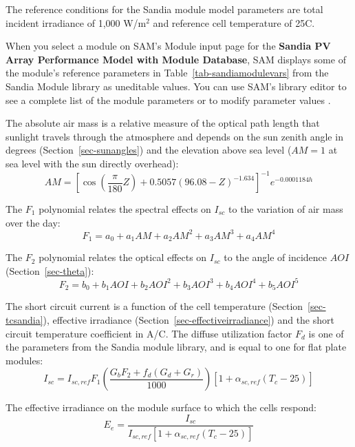 \documentclass[12pt,letterpaper]{article}
\newcommand\AOI{\ensuremath{\mathit{AOI}}}
\begin{document}
The reference conditions for the Sandia module model parameters are total incident irradiance of 1,000 W/m$^2$ and reference cell temperature of 25\degree C. 

When you select a module on SAM's Module input page for the \textbf{Sandia PV Array Performance Model with Module Database}, SAM displays some of the module's reference parameters in Table~\ref{tab-sandiamodulevars} from the Sandia Module library as uneditable values. You can use SAM's library editor to see a complete list of the module parameters or to modify parameter values \citep{help-libraries}.

The absolute air mass is a relative measure of the optical path length that sunlight travels through the atmosphere and depends on the sun zenith angle in degrees (Section~\ref{sec-sunangles}) and the elevation above sea level ($AM=1$ at sea level with the sun directly overhead):
\begin{equation}\label{eqn-sandiaam}
AM = \left[ \cos(\frac{\pi}{180} Z ) + 0.5057 (96.08 - Z)^{-1.634} \right]^{-1} e^{-0.0001184 h}
\end{equation}

The $F_1$ polynomial relates the spectral effects on $I_{sc}$ to the variation of air mass over the day:
\begin{equation}
F_1 = a_0 + a_1 AM + a_2 AM^2 + a_3 AM^3 + a_4 AM^4
\end{equation}

The $F_2$ polynomial relates the optical effects on $I_{sc}$ to the angle of incidence $\AOI$ (Section~\ref{sec-theta}):
\begin{equation}
F_2 = b_0 + b_1\AOI
		+ b_2\AOI^2
		+ b_3\AOI^3
		+ b_4\AOI^4
		+ b_5\AOI^5
\end{equation}

The short circuit current is a function of the cell temperature (Section~\ref{sec-tcsandia}), effective irradiance (Section~\ref{sec-effectiveirradiance}) and the short circuit temperature coefficient in A/\degree C. The diffuse utilization factor $F_d$ is one of the parameters from the Sandia module library, and is equal to one for flat plate modules:
\begin{equation}
I_{sc} = I_{sc,ref} F_1 \left( \frac{G_b F_2 + f_d (G_d+G_r)}{1000} \right) \left[1+\alpha_{sc,ref} (T_c-25)\right]
\end{equation}

The effective irradiance on the module surface to which the cells respond:
\begin{equation}
E_e = \frac{I_{sc}}{I_{sc,ref} \left[1 + \alpha_{sc,ref} (T_c - 25)\right]}
\end{equation}
\end{document}
